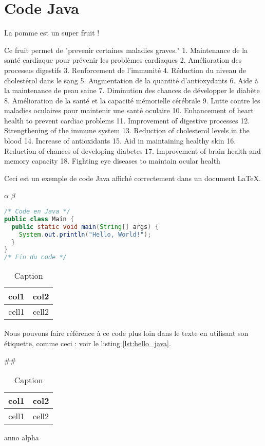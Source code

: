 \documentclass{article}
\begin{document}
\section{Code Java}

La pomme est un super fruit !





Ce fruit permet de "prevenir certaines maladies graves."
1. Maintenance de la santé cardiaque pour prévenir les problèmes cardiaques
2. Amélioration des processus digestifs
3. Renforcement de l'immunité
4. Réduction du niveau de cholestérol dans le sang
5. Augmentation de la quantité d'antioxydants
6. Aide à la maintenance de peau saine
7. Diminution des chances de développer le diabète
8. Amélioration de la santé et la capacité mémorielle cérébrale
9. Lutte contre les maladies oculaires pour maintenir une santé oculaire
10. Enhancement of heart health to prevent cardiac problems
11. Improvement of digestive processes
12. Strengthening of the immune system
13. Reduction of cholesterol levels in the blood
14. Increase of antioxidants
15. Aid in maintaining healthy skin
16. Reduction of chances of developing diabetes
17. Improvement of brain health and memory capacity
18. Fighting eye diseases to maintain ocular health











Ceci est un exemple de code Java affiché correctement dans un document LaTeX.

$\alpha$
$\beta$

\begin{lstlisting}[language=Java, caption={Exemple "Hello, World!" en Java.}, label={lst:hello_java}]
/* Code en Java */
public class Main {
  public static void main(String[] args) {
    System.out.println("Hello, World!");
  }
}
/* Fin du code */
\end{lstlisting}

\begin{table}[h!]
    \centering
    \begin{tabular}{|c|c|}
        \hline
        col1 & col2 \\
        \hline
        cell1 & cell2 \\
        \hline
    \end{tabular}
    \caption{Caption}
    \label{tab:my_label}
\end{table}

Nous pouvons faire référence à ce code plus loin dans le texte en utilisant son étiquette, comme ceci : voir le listing \ref{lst:hello_java}.

\#\#
\begin{table}[h!]
    \centering
    \begin{tabular}{|c|c|}
        \hline
        col1 & col2 \\
        \hline
        cell1 & cell2 \\
        \hline
    \end{tabular}
    \caption{Caption}
    \label{tab:my_label}
\end{table}

anno	
alpha 		
\end{document}
